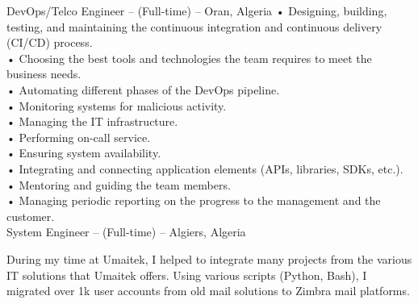 \documentclass{cv}
\begin{document}
{DevOps/Telco Engineer -- (Full-time)}
{\lab -- Oran, Algeria\vspace{.3cm}}
{
  • Designing, building, testing, and maintaining the continuous integration and continuous delivery (CI/CD) process.\\
  • Choosing the best tools and technologies the team requires to meet the business needs.\\
  • Automating different phases of the DevOps pipeline.\\
  • Monitoring systems for malicious activity.\\
  • Managing the IT infrastructure.\\
  • Performing on-call service.\\
  • Ensuring system availability.\\
  • Integrating and connecting application elements (APIs, libraries, SDKs, etc.).\\
  • Mentoring and guiding the team members.\\ 
  • Managing periodic reporting on the progress to the management and the customer.\\
}
{System Engineer -- (Full-time)}
{\umtk -- Algiers, Algeria\vspace{.3cm}}
{
During my time at Umaitek, I helped to integrate many projects from the various IT solutions that Umaitek offers.
Using various scripts (Python, Bash), I migrated over 1k user accounts from old mail solutions to Zimbra mail platforms.

}
\end{document}
